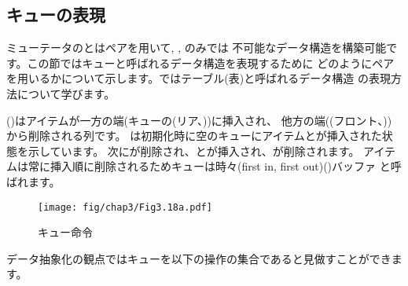 \subsection{キューの表現}
\label{Section 3.3.2}



ミューテータのとはペアを用いて, , のみでは
不可能なデータ構造を構築可能です。この節ではキューと呼ばれるデータ構造を表現するために
どのようにペアを用いるかについて示します。ではテーブル(表)と呼ばれるデータ構造
の表現方法について学びます。


()はアイテムが一方の端(キューの(リア、))に挿入され、
他方の端((フロント、))から削除される列です。
は初期化時に空のキューにアイテムとが挿入された状態を示しています。
次にが削除され、とが挿入され、が削除されます。
アイテムは常に挿入順に削除されるためキューは時々(first in, first out)()バッファ
と呼ばれます。

\begin{figure}[tb]
\label{Figure 3.18}
\centering
\begin{comment}
\heading{Figure 3.18:} Queue operations.

\begin{example}
Operation                Resulting Queue
(define q (make-queue))
(insert-queue! q 'a)     a
(insert-queue! q 'b)     a b
(delete-queue! q)        b
(insert-queue! q 'c)     b c
(insert-queue! q 'd)     b c d
(delete-queue! q)        c d
\end{example}
\end{comment}
\texttt{[image: fig/chap3/Fig3.18a.pdf]}
\par\bigskip
\noindent
{} キュー命令
\end{figure}

\noindent
データ抽象化の観点ではキューを以下の操作の集合であると見做すことができます。

